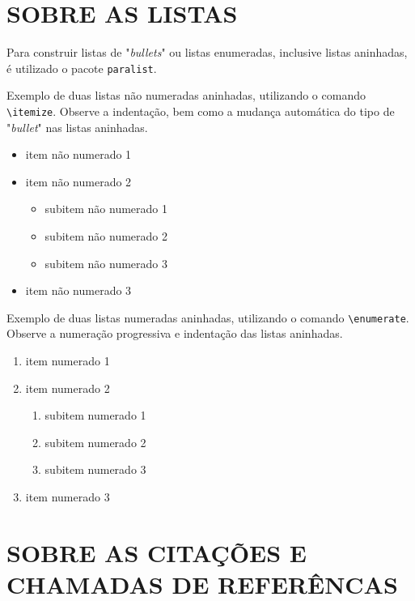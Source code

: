 \chapter{SOBRE AS LISTAS}
\label{chap:apSobreLista}

Para construir listas de "\textit{bullets}"{} ou listas enumeradas, inclusive listas aninhadas, é utilizado o pacote \verb|paralist|.

Exemplo de duas listas não numeradas aninhadas, utilizando o comando \verb|\itemize|. Observe a indentação, bem como a mudança automática do tipo de "\textit{bullet}"{} nas listas aninhadas.

\begin{itemize}
    \item item não numerado 1
    \item item não numerado 2
    \begin{itemize}
        \item subitem não numerado 1
        \item subitem não numerado 2
        \item subitem não numerado 3
    \end{itemize}
    \item item não numerado 3
\end{itemize}

Exemplo de duas listas numeradas aninhadas, utilizando o comando \verb|\enumerate|. Observe a numeração progressiva e indentação das listas aninhadas.

\begin{enumerate}
    \item item numerado 1
    \item item numerado 2
    \begin{enumerate}
        \item subitem numerado 1
        \item subitem numerado 2
        \item subitem numerado 3
    \end{enumerate}
    \item item numerado 3
\end{enumerate}

\chapter{SOBRE AS CITAÇÕES E CHAMADAS DE REFERÊNCAS}
\label{chap:apSobreCita}


